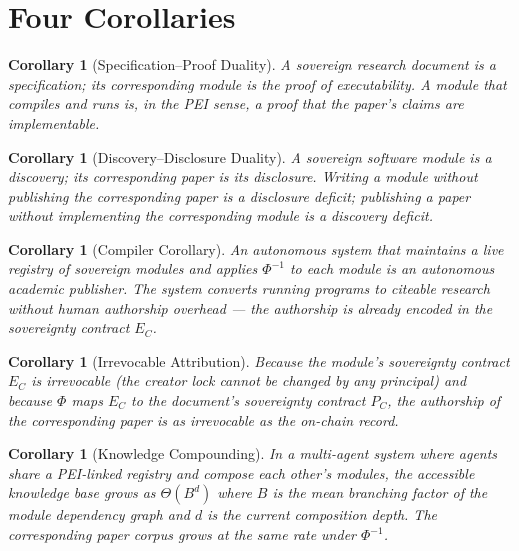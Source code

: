 \documentclass[12pt]{article}
\newtheorem{corollary}[theorem]{Corollary}
\begin{document}
\section{Four Corollaries}
\label{sec:corollaries}

\begin{corollary}[Specification--Proof Duality]
  A sovereign research document is a specification; its corresponding module is
  the proof of executability.  A module that compiles and runs is, in the
  PEI sense, a proof that the paper's claims are implementable.
\end{corollary}

\begin{corollary}[Discovery--Disclosure Duality]
  A sovereign software module is a discovery; its corresponding paper is its
  disclosure.  Writing a module without publishing the corresponding paper is a
  disclosure deficit; publishing a paper without implementing the corresponding
  module is a discovery deficit.
\end{corollary}

\begin{corollary}[Compiler Corollary]
  An autonomous system that maintains a live registry of sovereign modules and
  applies $\Phi^{-1}$ to each module is an \emph{autonomous academic publisher}.
  The system converts running programs to citeable research without human
  authorship overhead — the authorship is already encoded in the sovereignty
  contract $E_C$.
\end{corollary}

\begin{corollary}[Irrevocable Attribution]
  Because the module's sovereignty contract $E_C$ is irrevocable (the creator
  lock cannot be changed by any principal) and because $\Phi$ maps $E_C$ to
  the document's sovereignty contract $P_C$, the authorship of the
  corresponding paper is as irrevocable as the on-chain record.
\end{corollary}

\begin{corollary}[Knowledge Compounding]
  \label{cor:5}
  In a multi-agent system where agents share a PEI-linked registry and compose
  each other's modules, the accessible knowledge base grows as $\Theta(B^d)$
  where $B$ is the mean branching factor of the module dependency graph and $d$
  is the current composition depth.  The corresponding paper corpus grows at
  the same rate under $\Phi^{-1}$.
\end{corollary}
\end{document}
